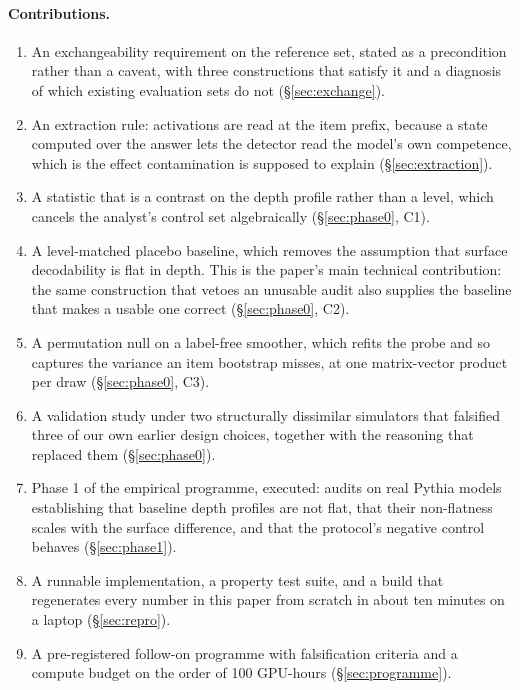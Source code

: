 \documentclass[10pt,twocolumn,letterpaper]{article}
\begin{document}
\paragraph{Contributions.}
\begin{enumerate}\itemsep2pt
\item An exchangeability requirement on the reference set, stated as a
precondition rather than a caveat, with three constructions that satisfy it
and a diagnosis of which existing evaluation sets do not (\S\ref{sec:exchange}).
\item An extraction rule: activations are read at the item prefix, because a
state computed over the answer lets the detector read the model's own
competence, which is the effect contamination is supposed to explain
(\S\ref{sec:extraction}).
\item A statistic that is a contrast on the depth profile rather than a level,
which cancels the analyst's control set algebraically (\S\ref{sec:phase0}, C1).
\item A level-matched placebo baseline, which removes the assumption that
surface decodability is flat in depth. This is the paper's main technical
contribution: the same construction that vetoes an unusable audit also
supplies the baseline that makes a usable one correct (\S\ref{sec:phase0}, C2).
\item A permutation null on a label-free smoother, which refits the probe and
so captures the variance an item bootstrap misses, at one matrix-vector
product per draw (\S\ref{sec:phase0}, C3).
\item A validation study under two structurally dissimilar simulators that
falsified three of our own earlier design choices, together with the reasoning
that replaced them (\S\ref{sec:phase0}).
\item Phase 1 of the empirical programme, executed: \PoneN{} audits on real
Pythia models establishing that baseline depth profiles are not flat, that
their non-flatness scales with the surface difference, and that the protocol's
negative control behaves (\S\ref{sec:phase1}).
\item A runnable implementation, a property test suite, and a build that
regenerates every number in this paper from scratch in about ten minutes on a
laptop (\S\ref{sec:repro}).
\item A pre-registered follow-on programme with falsification criteria and a
compute budget on the order of 100 GPU-hours (\S\ref{sec:programme}).
\end{enumerate}
\end{document}
